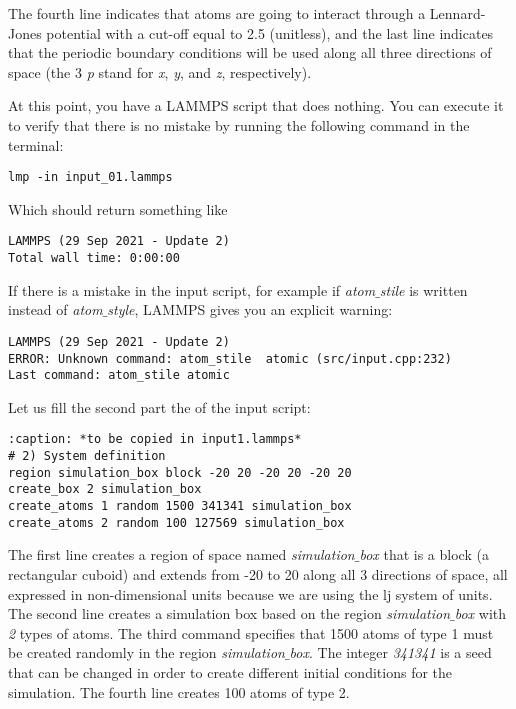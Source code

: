 The fourth line indicates that atoms are going to interact
through a Lennard-Jones potential with a cut-off equal to
2.5 (unitless), and the last line indicates that the
periodic boundary conditions will be used along all three
directions of space (the 3 \textit{p} stand for \textit{x}, \textit{y}, and \textit{z},
respectively).

At this point, you have a LAMMPS script that does nothing.
You can execute it to verify that there is no mistake by
running the following command in the terminal:

\begin{verbatim}
lmp -in input_01.lammps
\end{verbatim}

\noindent Which should return something like

\begin{verbatim}
LAMMPS (29 Sep 2021 - Update 2)
Total wall time: 0:00:00
\end{verbatim}

\noindent If there is a mistake in the input script, for example if
\textit{atom$\_$stile} is written instead of \textit{atom$\_$style}, LAMMPS
gives you an explicit warning:

\begin{verbatim}
LAMMPS (29 Sep 2021 - Update 2)
ERROR: Unknown command: atom_stile  atomic (src/input.cpp:232)
Last command: atom_stile atomic
\end{verbatim}

\noindent Let us fill the second part the of the input script:

\begin{verbatim}
:caption: *to be copied in input1.lammps*
# 2) System definition
region simulation_box block -20 20 -20 20 -20 20
create_box 2 simulation_box
create_atoms 1 random 1500 341341 simulation_box
create_atoms 2 random 100 127569 simulation_box
\end{verbatim}

\noindent The first line creates a region of space
named \textit{simulation$\_$box} that is a block (a rectangular cuboid) and
extends from -20 to 20 along all 3 directions of space, all expressed in
non-dimensional units because we are using the lj system
of units. The second line creates a simulation box based on
the region \textit{simulation$\_$box} with \textit{2} types of atoms. The third
command specifies that 1500 atoms of type 1 must be created
randomly in the region \textit{simulation$\_$box}. The integer \textit{341341} is a
seed that can be changed in order to create different
initial conditions for the simulation. The fourth line
creates 100 atoms of type 2.

